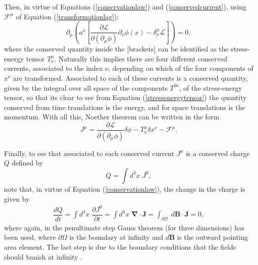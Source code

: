 Then, in virtue of Equations (\ref{conservationlaw}) and (\ref{conservedcurrent}), using $\mathcal{F}^{\mu}$ of Equation (\ref{transformationlag}):
\begin{equation}
    \label{stressenergytensor}
    \partial_{\mu} \left( a^{\nu}\left[ \dfrac{\partial\mathcal{L}}{\partial(\partial_{\mu}\phi)}\partial_{\nu}\phi(x) - \delta^{\mu}_{\nu}\mathcal{L} \right] \right) = 0,
\end{equation}
where the conserved quantity inside the [brackets] can be identified as the stress-energy tensor $T^{\mu}_{\nu}$. Naturally this implies there are four different conserved currents, associated to the index $\nu$, depending on which of the four components of $x^{\nu}$ are transformed. Associated to each of these currents is a conserved quantity, given by the integral over all space of the components $T^{0\nu}$, of the stress-energy tensor, so that its clear to see from Equation (\ref{stressenergytensor}) the quantity conserved from time translations is the energy, and for space translations is the momentum. With all this, Noether theorem can be written in the form
\begin{equation*}
    J^{\mu} = \dfrac{\partial\mathcal{L}}{\partial(\partial_{\mu}\phi)}\delta\phi - T^{\mu}_{\nu}\delta x^{\nu} - \mathcal{F}^{\mu}.
\end{equation*}

Finally, to see that associated to each conserved current $J^{\mu}$ is a conserved charge $Q$ defined by
\begin{equation*}
    Q = \int d^3x \; J^0,
\end{equation*}
note that, in virtue of Equation (\ref{conservationlaw}), the change in the charge is given by
\begin{align*}
    \dfrac{dQ}{dt} = \int d^3x \; \dfrac{\partial J^0}{\partial t} = \int d^3x \; \bm{\nabla}\cdot\bm{J} = \int_{\partial\Omega} \; d\bm{B} \cdot \bm{J} = 0, 
\end{align*}
where again, in the penultimate step Gauss theorem (for three dimensions) has been used, where $\partial\Omega$ is the boundary at infinity and $d\bm{B}$ is the outward pointing area element. The last step is due to the boundary conditions that the fields should banish at infinity \cite{Nagashima}.
